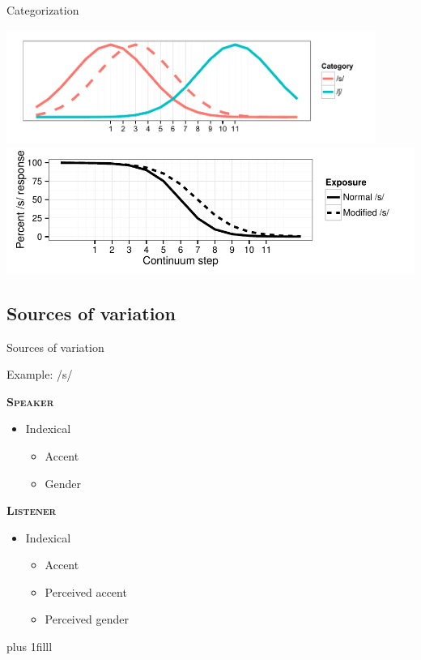 \documentclass{beamer}
\newcommand{\btVFill}{\vskip0pt plus 1filll}
\begin{document}
\begin{frame}{Categorization}

\includegraphics[width=0.905\textwidth]{graphs/dist}
\vfill
\includegraphics[width=1.0\textwidth]{graphs/class}

\end{frame}

\subsection{Sources of variation}

\begin{frame}{Sources of variation}

Example: /s/

\begin{minipage}[t]{0.45\textwidth}

\textbf{\textsc{Speaker}}

\begin{itemize}
\item Indexical
\begin{itemize}
\item Accent
\item Gender
\end{itemize}

\end{itemize}
\end{minipage}
\hfill
\begin{minipage}[t]{0.45\textwidth}
\textbf{\textsc{Listener}}

\begin{itemize}
\item Indexical
\begin{itemize}
\item Accent
\item Perceived accent
\item Perceived gender
\end{itemize}
\end{itemize}
\end{minipage}
\btVFill
\begin{flushright}
\scriptsize
\citet{Strand1996, Li2011, Kraljic2005}
\end{flushright}
\end{frame}
\end{document}
